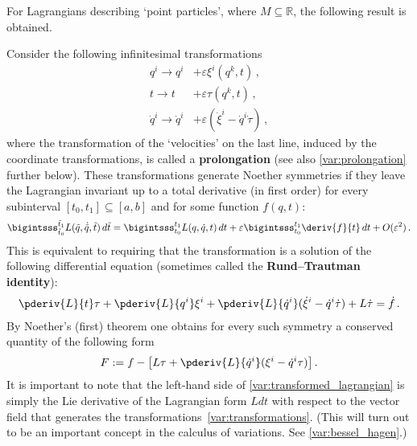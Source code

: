     For Lagrangians describing `point particles', where $M\subseteq\mathbb{R}$, the following result is obtained.
    \begin{example}
        Consider the following infinitesimal transformations
        \begin{align}
            q^i\longrightarrow q^i& + \varepsilon\xi^i(q^k,t)\,,\nonumber\\
            t\longrightarrow t& + \varepsilon\tau(q^k,t)\,,\label{var:transformations}\\
            \dot{q}^i\longrightarrow\dot{q}^i& + \varepsilon(\dot{\xi}^i - \dot{q}^i\dot{\tau})\,,\nonumber
        \end{align}
        where the transformation of the `velocities' on the last line, induced by the coordinate transformations, is called a \textbf{prolongation} (see also \cref{var:prolongation} further below). These transformations generate Noether symmetries if they leave the Lagrangian invariant up to a total derivative (in first order) for every subinterval $[t_0,t_1]\subseteq[a,b]$ and for some function $f(q,t)$:
        \begin{gather}
            \bigintsss_{\tilde{t}_0}^{\tilde{t}_1}L(\tilde{q},\dot{\tilde{q}},\tilde{t})\,d\tilde{t} = \bigintsss_{t_0}^{t_1}L(q,\dot{q},t)\,dt + \varepsilon\bigintsss_{t_0}^{t_1}\deriv{f}{t}\,dt + O(\varepsilon^2)\,.
        \end{gather}
        This is equivalent to requiring that the transformation is a solution of the following differential equation (sometimes called the \textbf{Rund--Trautman identity}):
        \begin{gather}
            \label{var:transformed_lagrangian}
            \pderiv{L}{t}\tau + \pderiv{L}{q^i}\xi^i + \pderiv{L}{\dot{q}^i}(\dot{\xi}^i - \dot{q}^i\dot{\tau}) + L\dot{\tau} = \dot{f}\,.
        \end{gather}
        By Noether's (first) theorem one obtains for every such symmetry a conserved quantity of the following form
        \begin{gather}
            F := f - \left[L\tau + \pderiv{L}{\dot{q}^i}(\xi^i - \dot{q}^i\tau)\right].
        \end{gather}
        It is important to note that the left-hand side of \cref{var:transformed_lagrangian} is simply the Lie derivative of the Lagrangian form $Ldt$ with respect to the vector field that generates the transformations~\eqref{var:transformations}. (This will turn out to be an important concept in the calculus of variations. See \cref{var:bessel_hagen}.)
    \end{example}

